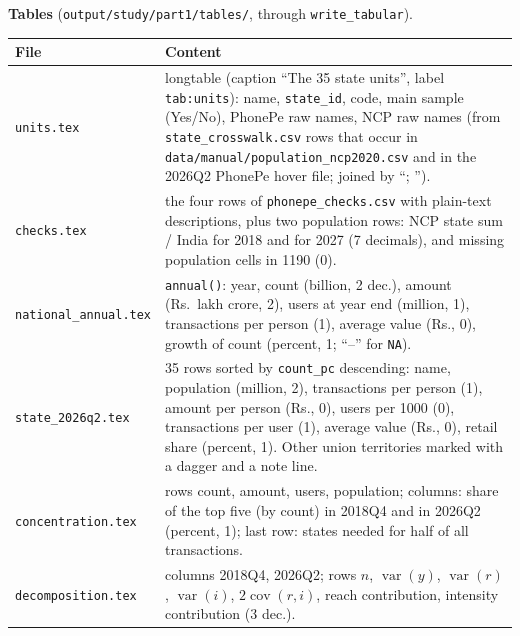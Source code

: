 \documentclass[10pt,a4paper]{article}
\newcommand{\f}[1]{\texttt{#1}}
\begin{document}
\textbf{Tables} (\f{output/study/part1/tables/}, through \f{write\_tabular}).
\par\noindent\begin{tabularx}{\textwidth}{@{}>{\raggedright\arraybackslash}p{} Y@{}}
\toprule
File & Content \\
\midrule
\f{units.tex} & longtable (caption ``The 35 state units'', label \f{tab:units}): name, \f{state\_id}, code, main
  sample (Yes/No), PhonePe raw names, NCP raw names (from \f{state\_crosswalk.csv} rows that occur in
  \f{data/manual/population\_ncp2020.csv} and in the 2026Q2 PhonePe hover file; joined by ``; ''). \\
\f{checks.tex} & the four rows of \f{phonepe\_checks.csv} with plain-text descriptions, plus two population rows:
  NCP state sum / India for 2018 and for 2027 (7 decimals), and missing population cells in 1190 (0). \\
\f{national\_annual.tex} & \f{annual()}: year, count (billion, 2 dec.), amount (Rs.\ lakh crore, 2), users at
  year end (million, 1), transactions per person (1), average value (Rs., 0), growth of count (percent, 1;
  ``--'' for \f{NA}). \\
\f{state\_2026q2.tex} & 35 rows sorted by \f{count\_pc} descending: name, population (million, 2), transactions
  per person (1), amount per person (Rs., 0), users per 1000 (0), transactions per user (1), average value (Rs., 0),
  retail share (percent, 1). Other union territories marked with a dagger and a note line. \\
\f{concentration.tex} & rows count, amount, users, population; columns: share of the top five (by count) in
  2018Q4 and in 2026Q2 (percent, 1); last row: states needed for half of all transactions. \\
\f{decomposition.tex} & columns 2018Q4, 2026Q2; rows $n$, $\operatorname{var}(y)$, $\operatorname{var}(r)$,
  $\operatorname{var}(i)$, $2\operatorname{cov}(r,i)$, reach contribution, intensity contribution (3 dec.). \\
\bottomrule
\end{tabularx}
\end{document}
